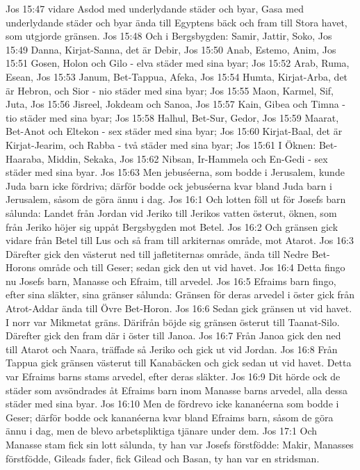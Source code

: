 Jos 15:47  vidare Asdod med underlydande städer och byar, Gasa med underlydande städer och byar ända till Egyptens bäck och fram till Stora havet, som utgjorde gränsen.
Jos 15:48  Och i Bergsbygden: Samir, Jattir, Soko,
Jos 15:49  Danna, Kirjat-Sanna, det är Debir,
Jos 15:50  Anab, Estemo, Anim,
Jos 15:51  Gosen, Holon och Gilo - elva städer med sina byar;
Jos 15:52  Arab, Ruma, Esean,
Jos 15:53  Janum, Bet-Tappua, Afeka,
Jos 15:54  Humta, Kirjat-Arba, det är Hebron, och Sior - nio städer med sina byar;
Jos 15:55  Maon, Karmel, Sif, Juta,
Jos 15:56  Jisreel, Jokdeam och Sanoa,
Jos 15:57  Kain, Gibea och Timna - tio städer med sina byar;
Jos 15:58  Halhul, Bet-Sur, Gedor,
Jos 15:59  Maarat, Bet-Anot och Eltekon - sex städer med sina byar;
Jos 15:60  Kirjat-Baal, det är Kirjat-Jearim, och Rabba - två städer med sina byar;
Jos 15:61  I Öknen: Bet-Haaraba, Middin, Sekaka,
Jos 15:62  Nibsan, Ir-Hammela och En-Gedi - sex städer med sina byar.
Jos 15:63  Men jebuséerna, som bodde i Jerusalem, kunde Juda barn icke fördriva; därför bodde ock jebuséerna kvar bland Juda barn i Jerusalem, såsom de göra ännu i dag.
Jos 16:1  Och lotten föll ut för Josefs barn sålunda: Landet från Jordan vid Jeriko till Jerikos vatten österut, öknen, som från Jeriko höjer sig uppåt Bergsbygden mot Betel.
Jos 16:2  Och gränsen gick vidare från Betel till Lus och så fram till arkiternas område, mot Atarot.
Jos 16:3  Därefter gick den västerut ned till jafletiternas område, ända till Nedre Bet-Horons område och till Geser; sedan gick den ut vid havet.
Jos 16:4  Detta fingo nu Josefs barn, Manasse och Efraim, till arvedel.
Jos 16:5  Efraims barn fingo, efter sina släkter, sina gränser sålunda: Gränsen för deras arvedel i öster gick från Atrot-Addar ända till Övre Bet-Horon.
Jos 16:6  Sedan gick gränsen ut vid havet. I norr var Mikmetat gräns. Därifrån böjde sig gränsen österut till Taanat-Silo. Därefter gick den fram där i öster till Janoa.
Jos 16:7  Från Janoa gick den ned till Atarot och Naara, träffade så Jeriko och gick ut vid Jordan.
Jos 16:8  Från Tappua gick gränsen västerut till Kanabäcken och gick sedan ut vid havet. Detta var Efraims barns stams arvedel, efter deras släkter.
Jos 16:9  Dit hörde ock de städer som avsöndrades åt Efraims barn inom Manasse barns arvedel, alla dessa städer med sina byar.
Jos 16:10  Men de fördrevo icke kananéerna som bodde i Geser; därför bodde ock kananéerna kvar bland Efraims barn, såsom de göra ännu i dag, men de blevo arbetspliktiga tjänare under dem.
Jos 17:1  Och Manasse stam fick sin lott sålunda, ty han var Josefs förstfödde: Makir, Manasses förstfödde, Gileads fader, fick Gilead och Basan, ty han var en stridsman.
